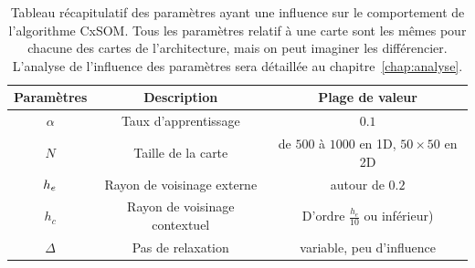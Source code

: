 \begin{table}
\caption{Tableau récapitulatif des paramètres ayant une influence sur le comportement de l'algorithme CxSOM. Tous les paramètres relatif à une carte sont les mêmes pour chacune des cartes de l'architecture, mais on peut imaginer les différencier. L'analyse de l'influence des paramètres sera détaillée au chapitre~\ref{chap:analyse}.}
\hfill
\begin{tabular}{|c|c|c|}
\hline
Paramètres & Description & Plage de valeur \\
\hline
$\alpha$ & Taux d'apprentissage & $0.1$ \\
$N$ & Taille de la carte & de $500$ à $1000$ en 1D, $50 \times 50$ en 2D \\
$h_e$ & Rayon de voisinage externe & autour de $0.2$ \\
$h_c$ & Rayon de voisinage contextuel & D'ordre $\frac{h_e}{10}$ ou inférieur) \\
$\Delta$ & Pas de relaxation & variable, peu d'influence\\
\hline
\end{tabular}
\end{table}



